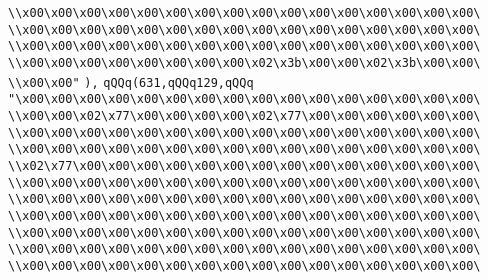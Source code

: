 \verb|\\x00\x00\x00\x00\x00\x00\x00\x00\x00\x00\x00\x00\x00\x00\x00\x00\|\newline
\verb|\\x00\x00\x00\x00\x00\x00\x00\x00\x00\x00\x00\x00\x00\x00\x00\x00\|\newline
\verb|\\x00\x00\x00\x00\x00\x00\x00\x00\x00\x00\x00\x00\x00\x00\x00\x00\|\newline
\verb|\\x00\x00\x00\x00\x00\x00\x00\x00\x02\x3b\x00\x00\x02\x3b\x00\x00\|\newline
\verb|\\x00\x00"|\newline
\verb|),|\newline
\verb|qQQq(631,qQQq129,qQQq|\newline
\verb|"\x00\x00\x00\x00\x00\x00\x00\x00\x00\x00\x00\x00\x00\x00\x00\x00\|\newline
\verb|\\x00\x00\x02\x77\x00\x00\x00\x00\x02\x77\x00\x00\x00\x00\x00\x00\|\newline
\verb|\\x00\x00\x00\x00\x00\x00\x00\x00\x00\x00\x00\x00\x00\x00\x00\x00\|\newline
\verb|\\x00\x00\x00\x00\x00\x00\x00\x00\x00\x00\x00\x00\x00\x00\x00\x00\|\newline
\verb|\\x02\x77\x00\x00\x00\x00\x00\x00\x00\x00\x00\x00\x00\x00\x00\x00\|\newline
\verb|\\x00\x00\x00\x00\x00\x00\x00\x00\x00\x00\x00\x00\x00\x00\x00\x00\|\newline
\verb|\\x00\x00\x00\x00\x00\x00\x00\x00\x00\x00\x00\x00\x00\x00\x00\x00\|\newline
\verb|\\x00\x00\x00\x00\x00\x00\x00\x00\x00\x00\x00\x00\x00\x00\x00\x00\|\newline
\verb|\\x00\x00\x00\x00\x00\x00\x00\x00\x00\x00\x00\x00\x00\x00\x00\x00\|\newline
\verb|\\x00\x00\x00\x00\x00\x00\x00\x00\x00\x00\x00\x00\x00\x00\x00\x00\|\newline
\verb|\\x00\x00\x00\x00\x00\x00\x00\x00\x00\x00\x00\x00\x00\x00\x00\x00\|\newline
